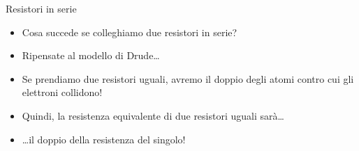 \begin{frame}{Resistori in serie}
  \begin{figure}
    \centering
  \end{figure}
  \begin{itemize}
  \item<1-> Cosa succede se colleghiamo due resistori in serie?
  \item<1-> Ripensate al modello di Drude\ldots
  \item<invisible@1> Se prendiamo due resistori uguali, avremo il doppio degli atomi contro cui gli elettroni collidono!
  \item<invisible@1> Quindi, la resistenza equivalente di due resistori uguali sarà\ldots
  \item<invisible@-2> \ldots{}il doppio della resistenza del singolo!
  \end{itemize}
\end{frame}

